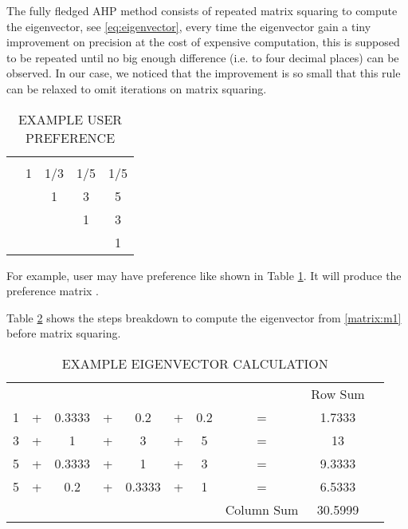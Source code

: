 \documentclass[journal]{IEEEtran}
\begin{document}
The fully fledged AHP method consists of repeated matrix squaring to compute the eigenvector, see \ref{eq:eigenvector}, every time the eigenvector gain a tiny improvement on precision at the cost of expensive computation, this is supposed to be repeated until no big enough difference (i.e. to four decimal places)  can be observed. In our case, we noticed that the improvement is so small that this rule can be relaxed to omit iterations on matrix squaring.




\begin{table}
\caption{EXAMPLE USER PREFERENCE}
\label{table:weight_example}
\begin{tabular}{@{}c@{}c@{}c@{}c@{}c@{}}
&  &  &  &  \\
 & 1 & 1/3 & 1/5 & 1/5 \\
 & & 1 & 3 & 5 \\
 & & & 1 & 3 \\
 & & & & 1 \\
\end{tabular}
\end{table}


For example, user may have preference like shown in Table \ref{table:weight_example}. It will produce the preference matrix .





Table \ref{table:example_eigenvector} shows the steps breakdown to compute the eigenvector from \ref{matrix:m1} before matrix squaring.


\begin{table}[h]
\caption{EXAMPLE EIGENVECTOR CALCULATION}
\label{table:example_eigenvector}
\begin{tabular}{cccccccccc}
          &   &        &   &        &   &     &            & Row Sum \\
        1 & + & 0.3333 & + & 0.2    & + & 0.2 & =          & 1.7333  \\
        3 & + & 1      & + & 3      & + & 5   & =          & 13      \\
        5 & + & 0.3333 & + & 1      & + & 3   & =          & 9.3333  \\
        5 & + & 0.2    & + & 0.3333 & + & 1   & =          & 6.5333  \\
          &   &        &   &        &   &     & Column Sum & 30.5999 \\        
\end{tabular}
\end{table}
\end{document}
